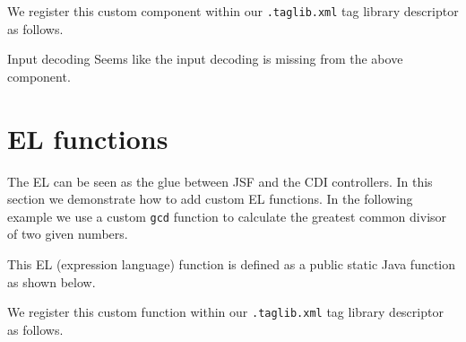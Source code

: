 We register this custom component within our \texttt{.taglib.xml} tag library descriptor as follows.


\begin{TODO}{Input decoding}
	Seems like the input decoding is missing from the above component.
\end{TODO}


\section{EL functions}
The EL can be seen as the glue between JSF and the CDI controllers.
In this section we demonstrate how to add custom EL functions.
In the following example we use a custom \texttt{gcd} function to calculate the greatest common divisor of two given numbers.


This EL (expression language) function is defined as a public static Java function as shown below.


We register this custom function within our \texttt{.taglib.xml} tag library descriptor as follows.

